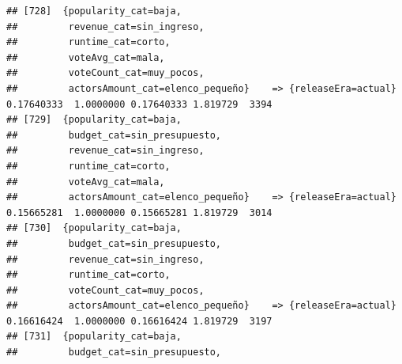 \documentclass[
]{article}
\begin{document}
\begin{verbatim}
## [728]  {popularity_cat=baja,                                                                                                    
##         revenue_cat=sin_ingreso,                                                                                                
##         runtime_cat=corto,                                                                                                      
##         voteAvg_cat=mala,                                                                                                       
##         voteCount_cat=muy_pocos,                                                                                                
##         actorsAmount_cat=elenco_pequeño}    => {releaseEra=actual}               0.17640333  1.0000000 0.17640333 1.819729  3394
## [729]  {popularity_cat=baja,                                                                                                    
##         budget_cat=sin_presupuesto,                                                                                             
##         revenue_cat=sin_ingreso,                                                                                                
##         runtime_cat=corto,                                                                                                      
##         voteAvg_cat=mala,                                                                                                       
##         actorsAmount_cat=elenco_pequeño}    => {releaseEra=actual}               0.15665281  1.0000000 0.15665281 1.819729  3014
## [730]  {popularity_cat=baja,                                                                                                    
##         budget_cat=sin_presupuesto,                                                                                             
##         revenue_cat=sin_ingreso,                                                                                                
##         runtime_cat=corto,                                                                                                      
##         voteCount_cat=muy_pocos,                                                                                                
##         actorsAmount_cat=elenco_pequeño}    => {releaseEra=actual}               0.16616424  1.0000000 0.16616424 1.819729  3197
## [731]  {popularity_cat=baja,                                                                                                    
##         budget_cat=sin_presupuesto,                                                                                             

\end{verbatim}
\end{document}
